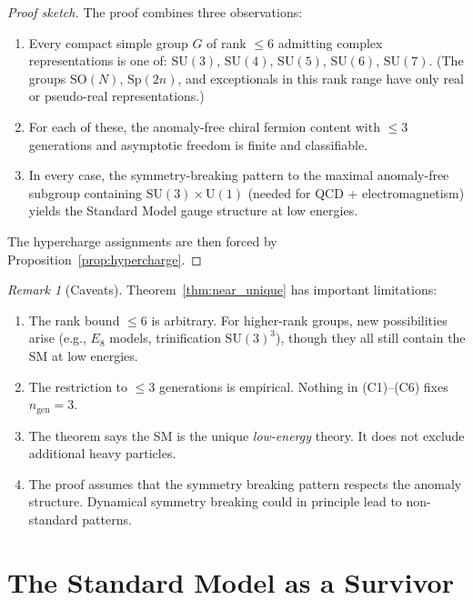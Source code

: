 \documentclass[12pt]{article}
\theoremstyle{definition}
\theoremstyle{remark}
\newtheorem{remark}[theorem]{Remark}
\newcommand{\SU}{\mathrm{SU}}
\newcommand{\SO}{\mathrm{SO}}
\newcommand{\Sp}{\mathrm{Sp}}
\newcommand{\UU}{\mathrm{U}}
\begin{document}
\begin{proof}[Proof sketch]
The proof combines three observations:
\begin{enumerate}
\item Every compact simple group $G$ of rank $\leq 6$ admitting
  complex representations is one of:
  $\SU(3)$, $\SU(4)$, $\SU(5)$, $\SU(6)$, $\SU(7)$.
  (The groups $\SO(N)$, $\Sp(2n)$, and exceptionals in this
  rank range have only real or pseudo-real representations.)

\item For each of these, the anomaly-free chiral fermion
  content with $\leq 3$ generations and asymptotic freedom
  is finite and classifiable.

\item In every case, the symmetry-breaking pattern to the
  maximal anomaly-free subgroup containing $\SU(3) \times \UU(1)$
  (needed for QCD + electromagnetism) yields the Standard Model
  gauge structure at low energies.
\end{enumerate}
The hypercharge assignments are then forced by
Proposition~\ref{prop:hypercharge}.
\end{proof}

\begin{remark}[Caveats]
\label{rem:caveats}
Theorem~\ref{thm:near_unique} has important limitations:
\begin{enumerate}[label=(\alph*)]
\item The rank bound $\leq 6$ is arbitrary.  For higher-rank
  groups, new possibilities arise (e.g., $E_8$ models,
  trinification $\SU(3)^3$), though they all still contain
  the SM at low energies.
\item The restriction to $\leq 3$ generations is empirical.
  Nothing in (C1)--(C6) fixes $n_{\mathrm{gen}} = 3$.
\item The theorem says the SM is the unique \emph{low-energy}
  theory.  It does not exclude additional heavy particles.
\item The proof assumes that the symmetry breaking pattern
  respects the anomaly structure.  Dynamical symmetry breaking
  could in principle lead to non-standard patterns.
\end{enumerate}
\end{remark}

\section{The Standard Model as a Survivor}
\label{sec:SM}
\end{document}
